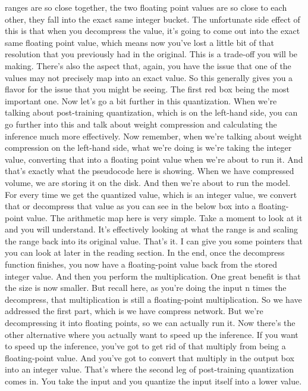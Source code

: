 ranges are so close together, the two floating point values
are so close to each other, they fall into the exact same integer bucket.
The unfortunate side effect of this is that when you decompress the value,
it's going to come out into the exact same floating point value, which
means now you've lost a little bit of that resolution
that you previously had in the original.
This is a trade-off you will be making.
There's also the aspect that, again, you have the issue that one of the values
may not precisely map into an exact value.
So this generally gives you a flavor for the issue that you might be seeing.
The first red box being the most important one.
Now let's go a bit further in this quantization.
When we're talking about post-training quantization, which
is on the left-hand side, you can go further into this
and talk about weight compression and calculating the inference
much more effectively.
Now remember, when we're talking about weight compression
on the left-hand side, what we're doing is we're taking the integer value,
converting that into a floating point value when we're about to run it.
And that's exactly what the pseudocode here is showing.
When we have compressed volume, we are storing it on the disk.
And then we're about to run the model.
For every time we get the quantized value, which is an integer value,
we convert that or decompress that value as you
can see in the below box into a floating-point value.
The arithmetic map here is very simple.
Take a moment to look at it and you will understand.
It's effectively looking at what the range is and scaling the range back
into its original value.
That's it.
I can give you some pointers that you can
look at later in the reading section.
In the end, once the decompress function finishes,
you now have a floating-point value back from the stored integer value.
And then you perform the multiplication.
One great benefit is that the size is now smaller.
But recall here, as you're doing the input n times the decompress,
that multiplication is still a floating-point multiplication.
So we have addressed the first part, which is we have compress network.
But we're decompressing it into floating points, so we can actually run it.
Now there's the other alternative where you actually
want to speed up the inference.
If you want to speed up the inference, you've got to get rid of that multiply
from being a floating-point value.
And you've got to convert that multiply in the output box
into an integer value.
That's where the second leg of post-training quantization comes in.
You take the input and you quantize the input itself into a lower value.
